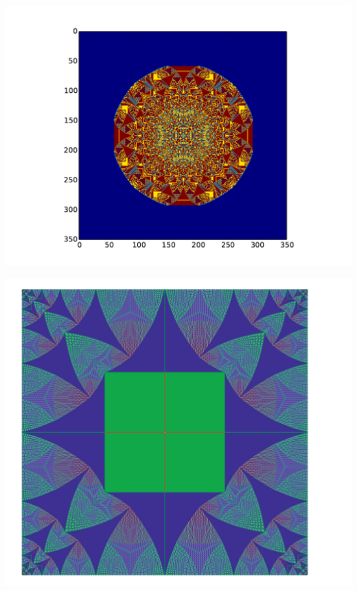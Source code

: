 \documentclass{beamer}
\begin{document}
\begin{frame}
\begin{center}
\includegraphics[scale = 0.5]{pic_sandpile}
\end{center}
\end{frame}

\begin{frame}
\begin{center}
\includegraphics[scale = 0.5]{sandpile2}
\end{center}
\end{frame}
\end{document}
